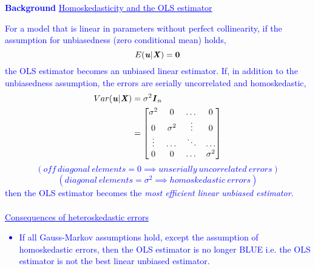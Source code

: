 \documentclass[12pt]{report}
\newenvironment{blueframed}[1][blue]
{\def\FrameCommand{\fboxsep=\FrameSep\fcolorbox{#1}{white}}%
\MakeFramed {\advance\hsize-\width \FrameRestore}}
{\endMakeFramed}
\begin{document}
\justify
\begin{blueframed}
	\textcolor{blue}{\textbf{Background}}
	\vspace{-\baselineskip}
	\justify
	\textcolor{blue}{\underline{Homoskedasticity and the OLS estimator}}
	
	\noindent \textcolor{blue}
	{
		For a model that is linear in parameters without perfect collinearity, if the assumption for unbiasedness (zero conditional mean) holds, $$E(\textbf{\textit{u}}|\textbf{\textit{X}}) = \textbf{0}$$ the OLS estimator becomes an unbiased linear estimator. If, in addition to the unbiasedness assumption, the errors are serially uncorrelated and homoskedastic, \begin{align*}
		Var(\textbf{\textit{u}}|\textbf{\textit{X}}) &= \sigma^2\textbf{\textit{I}}_n \\
		&=\begin{bmatrix}
		\sigma^2 & 0 & \dots & 0 \\
		0 & \sigma^2 & \vdots & 0 \\
		\vdots & \dots & \ddots & \dots \\
		0 & 0 & \dots & \sigma^2
		\end{bmatrix}
		\end{align*} $$(off\ diagonal\ elements = 0 \implies unserially\ uncorrelated\ errors)$$ $$(diagonal\ elements = \sigma^2 \implies homoskedastic\ errors)$$ then the OLS estimator becomes the \textit{most efficient linear unbiased estimator}. \\ \\ \uline{Consequences of heteroskedastic errors} \begin{itemize}
			\item If all Gauss-Markov assumptions hold, except the assumption of homoskedastic errors, then the OLS estimator is no longer BLUE i.e. the OLS estimator is not the best linear unbiased estimator.
		\end{itemize}  
	}
\end{blueframed}
\end{document}
